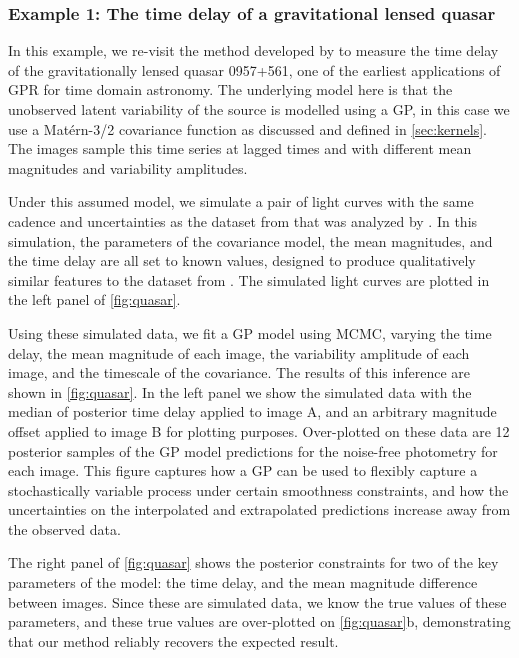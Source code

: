 \documentclass[letterpaper]{ar-1col}
\begin{document}
\subsubsection{Example 1: The time delay of a gravitational lensed quasar}
\label{sec:quasar}

In this example, we re-visit the method developed by \citet{prh92a} to measure the time delay of the gravitationally lensed quasar 0957+561, one of the earliest applications of GPR for time domain astronomy.
The underlying model here is that the unobserved latent variability of the source is modelled using a GP, in this case we use a Mat\'ern-3/2 covariance function as discussed and defined in \autoref{sec:kernels}.
The images sample this time series at lagged times and with different mean magnitudes and variability amplitudes.

Under this assumed model, we simulate a pair of light curves with the same cadence and uncertainties as the dataset from \citet{1989A&A...215....1V} that was analyzed by \citet{prh92a}.
In this simulation, the parameters of the covariance model, the mean magnitudes, and the time delay are all set to known values, designed to produce qualitatively similar features to the dataset from \citet{1989A&A...215....1V}.
The simulated light curves are plotted in the left panel of \autoref{fig:quasar}.

Using these simulated data, we fit a GP model using MCMC, varying the time delay, the mean magnitude of each image, the variability amplitude of each image, and the timescale of the covariance.
The results of this inference are shown in \autoref{fig:quasar}.
In the left panel we show the simulated data with the median of posterior time delay applied to image A, and an arbitrary magnitude offset applied to image B for plotting purposes.
Over-plotted on these data are 12 posterior samples of the GP model predictions for the noise-free photometry for each image.
This figure captures how a GP can be used to flexibly capture a stochastically variable process under certain smoothness constraints, and how the uncertainties on the interpolated and extrapolated predictions increase away from the observed data.

The right panel of \autoref{fig:quasar} shows the posterior constraints for two of the key parameters of the model: the time delay, and the mean magnitude difference between images.
Since these are simulated data, we know the true values of these parameters, and these true values are over-plotted on \autoref{fig:quasar}b, demonstrating that our method reliably recovers the expected result.
\end{document}
